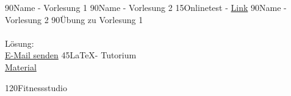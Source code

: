 \documentclass{article}
\begin{document}
  
  \begin{plan}
    \VorlEins {} {90}{Name - Vorlesung 1}
    \VorlZwei {} {90}{Name - Vorlesung 2}
    \Deadline {} {15}{Onlinetest - \href{www.test.de}{Link}}
    \VorlDrei {} {90}{Name - Vorlesung 2}
    \Uebung {} {90}{Übung zu Vorlesung 1\\\ \\Lösung:\\ \href{mailto:max.muster@informatik.uni-hamburg.de}{E-Mail senden}}
	\Tutorium {} {45}{\LaTeX - Tutorium\\\href{https://github.com/JamesJux/Latex-Stundenplan}{Material}}
    
    \Privat {} {120}{Fitnessstudio}
    \Legende{\LVorlEins\LVorlZwei\LVorlDrei\LUebung\LTutorium\LSeminar\LPrivat}
  \end{plan}
\end{document}
